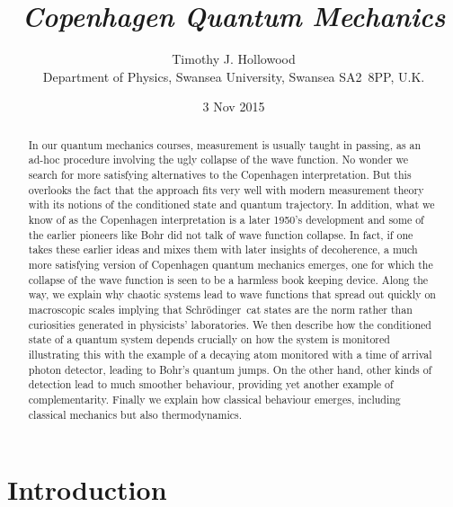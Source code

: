 \documentclass[12pt]{article}
\theoremstyle{plain}
\theoremstyle{definition}
\theoremstyle{remark}
\def\SCH{Schr\"odinger\ }
\begin{document}


\title{\textit{Copenhagen Quantum Mechanics}}

\author{
Timothy J. Hollowood\\
Department of Physics, Swansea University, Swansea SA2~8PP, U.K.\\
}
\date{3 Nov 2015}

\maketitle

\begin{abstract}
In our quantum mechanics courses, measurement is usually taught in passing, as an ad-hoc procedure involving the ugly collapse of the wave function. No wonder we search for more satisfying alternatives to the Copenhagen interpretation. 
But this overlooks the fact that the approach fits very well with modern measurement theory with its notions of the conditioned state and quantum trajectory. In addition, what we know of as the Copenhagen interpretation is a later 1950's development and some of the earlier pioneers like Bohr did not talk of wave function collapse. In fact, if one takes these earlier ideas and mixes them with later insights of decoherence, a much more satisfying version of Copenhagen quantum mechanics emerges, one for which the collapse of the wave function is seen to be a harmless book keeping device.
Along the way, we explain why chaotic systems lead to wave functions that spread out quickly on macroscopic scales implying that \SCH cat states are the norm rather than curiosities generated in physicists' laboratories. We then describe how the conditioned state of a quantum system depends crucially on how the system is monitored illustrating this with the example of a decaying atom monitored with a time of arrival photon detector, leading to Bohr's quantum jumps. On the other hand, other kinds of detection lead to much smoother behaviour, providing yet another example of complementarity.
Finally we explain how classical behaviour emerges, including classical mechanics but also thermodynamics.\end{abstract}

\newpage

\section{Introduction}\label{s1}
\end{document}
